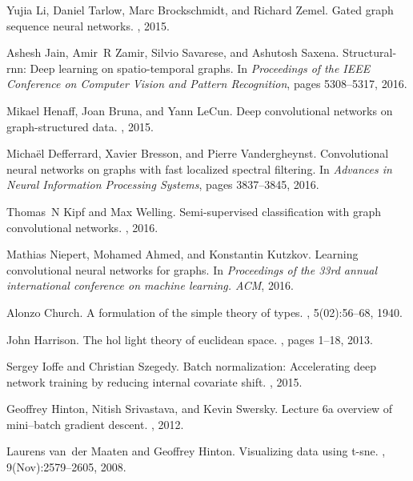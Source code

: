 \documentclass{article}
\begin{document}
\begin{thebibliography}{10}
Yujia Li, Daniel Tarlow, Marc Brockschmidt, and Richard Zemel.
\newblock Gated graph sequence neural networks.
, 2015.

Ashesh Jain, Amir~R Zamir, Silvio Savarese, and Ashutosh Saxena.
\newblock Structural-rnn: Deep learning on spatio-temporal graphs.
\newblock In {\em Proceedings of the IEEE Conference on Computer Vision and
  Pattern Recognition}, pages 5308--5317, 2016.

Mikael Henaff, Joan Bruna, and Yann LeCun.
\newblock Deep convolutional networks on graph-structured data.
, 2015.

Micha{\"e}l Defferrard, Xavier Bresson, and Pierre Vandergheynst.
\newblock Convolutional neural networks on graphs with fast localized spectral
  filtering.
\newblock In {\em Advances in Neural Information Processing Systems}, pages
  3837--3845, 2016.

Thomas~N Kipf and Max Welling.
\newblock Semi-supervised classification with graph convolutional networks.
, 2016.

Mathias Niepert, Mohamed Ahmed, and Konstantin Kutzkov.
\newblock Learning convolutional neural networks for graphs.
\newblock In {\em Proceedings of the 33rd annual international conference on
  machine learning. ACM}, 2016.

Alonzo Church.
\newblock A formulation of the simple theory of types.
, 5(02):56--68, 1940.

John Harrison.
\newblock The hol light theory of euclidean space.
, pages 1--18, 2013.

Sergey Ioffe and Christian Szegedy.
\newblock Batch normalization: Accelerating deep network training by reducing
  internal covariate shift.
, 2015.

Geoffrey Hinton, Nitish Srivastava, and Kevin Swersky.
\newblock Lecture 6a overview of mini--batch gradient descent.
\newblock {\em Coursera Lecture slides https://class. coursera.
  org/neuralnets-2012-001/lecture,[Online}, 2012.

Laurens van~der Maaten and Geoffrey Hinton.
\newblock Visualizing data using t-sne.
, 9(Nov):2579--2605, 2008.

\end{thebibliography}
 
\end{document}
